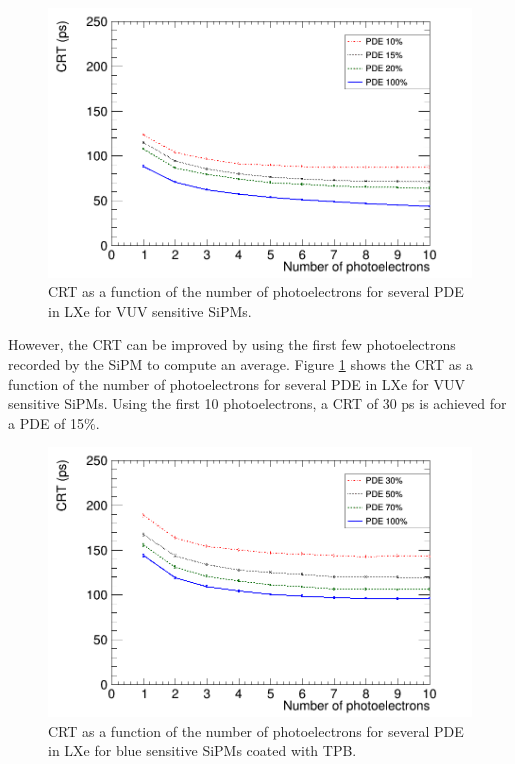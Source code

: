 \documentclass[review]{elsarticle}
\begin{document}
\begin{figure}[!bhtp]
	\centering
	\includegraphics[scale=0.4]{../img/lxe_noCher_avg_npe.png}
	\caption{\label{fig.crt4} CRT as a function of the number of photoelectrons for several PDE in LXe for VUV sensitive SiPMs.}
\end{figure}

However, the CRT can be improved by using the first few photoelectrons recorded by the SiPM to compute an average. 
Figure \ref{fig.crt4} shows the CRT as a function of the number of photoelectrons for several PDE in LXe for VUV sensitive SiPMs. Using the first 10 photoelectrons, a CRT of 30 ps is achieved for a PDE of 15\%. 

\begin{figure}[!bhtp]
	\centering
	\includegraphics[scale=0.4]{../img/lxe_tpb_noCher_avg_npe.png}
	\caption{\label{fig.crt5} CRT as a function of the number of photoelectrons for several PDE in LXe for blue sensitive SiPMs coated with TPB.}
\end{figure}
\end{document}
